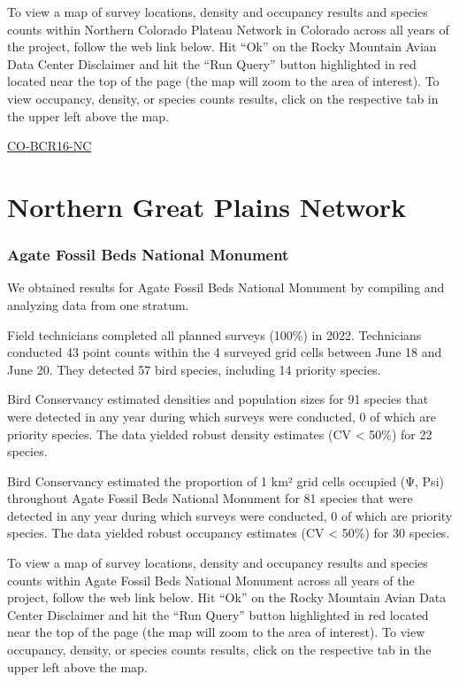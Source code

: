 \documentclass[
  letterpaper,
  DIV=11,
  numbers=noendperiod,
  oneside]{scrreprt}
\begin{document}
To view a map of survey locations, density and occupancy results and
species counts within Northern Colorado Plateau Network in Colorado
across all years of the project, follow the web link below. Hit ``Ok''
on the Rocky Mountain Avian Data Center Disclaimer and hit the ``Run
Query'' button highlighted in red located near the top of the page (the
map will zoom to the area of interest). To view occupancy, density, or
species counts results, click on the respective tab in the upper left
above the map.

\href{http://www.rmbo.org/new_site/adc/QueryWindow.aspx\#N4IgzgLgTghhCuBbEAuABCAwgeQLQCFMAlARgDZcA5TdSuASwHsA7GAGzQAUYoBrNAMoBTKADd6AYyFpcaSoygQAFiOZpMjNgpgATRlzZwhMeHKEQA7gt4gAvkA=}{CO-BCR16-NC}

\hypertarget{northern-great-plains-network}{%
\section{Northern Great Plains
Network}\label{northern-great-plains-network}}

\hypertarget{agate-fossil-beds-national-monument}{%
\subsubsection{Agate Fossil Beds National
Monument}\label{agate-fossil-beds-national-monument}}

We obtained results for Agate Fossil Beds National Monument by compiling
and analyzing data from one stratum.

Field technicians completed all planned surveys (100\%) in 2022.
Technicians conducted 43 point counts within the 4 surveyed grid cells
between June 18 and June 20. They detected 57 bird species, including 14
priority species.

Bird Conservancy estimated densities and population sizes for 91 species
that were detected in any year during which surveys were conducted, 0 of
which are priority species. The data yielded robust density estimates
(CV \textless{} 50\%) for 22 species.

Bird Conservancy estimated the proportion of 1 km² grid cells occupied
(Ψ, Psi) throughout Agate Fossil Beds National Monument for 81 species
that were detected in any year during which surveys were conducted, 0 of
which are priority species. The data yielded robust occupancy estimates
(CV \textless{} 50\%) for 30 species.

To view a map of survey locations, density and occupancy results and
species counts within Agate Fossil Beds National Monument across all
years of the project, follow the web link below. Hit ``Ok'' on the Rocky
Mountain Avian Data Center Disclaimer and hit the ``Run Query'' button
highlighted in red located near the top of the page (the map will zoom
to the area of interest). To view occupancy, density, or species counts
results, click on the respective tab in the upper left above the map.
\end{document}
